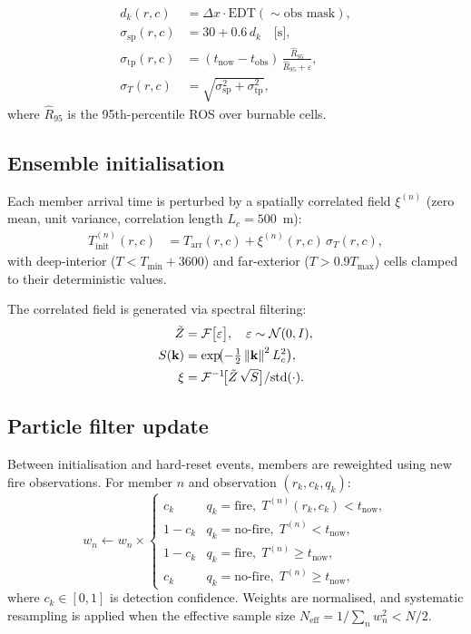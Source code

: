 \documentclass[11pt,twocolumn]{article}
\newcommand{\norm}[1]{\left\lVert#1\right\rVert}
\begin{document}
\begin{align}
  d_k(r,c) &= \Delta x\cdot\mathrm{EDT}(\sim\text{obs mask}),\label{eq:dist}\\
  \sigma_{\mathrm{sp}}(r,c) &= 30 + 0.6\,d_k\quad\text{[s]},\label{eq:sigsp}\\
  \sigma_{\mathrm{tp}}(r,c) &= (t_{\mathrm{now}}-t_{\mathrm{obs}})\,
    \frac{\hat{R}_{95}}{\hat{R}_{95}+\varepsilon},\label{eq:sigtp}\\
  \sigma_T(r,c) &= \sqrt{\sigma_{\mathrm{sp}}^2+\sigma_{\mathrm{tp}}^2},\label{eq:sigT}
\end{align}
where $\hat{R}_{95}$ is the 95th-percentile ROS over burnable cells.

\subsection{Ensemble initialisation}

Each member arrival time is perturbed by a spatially correlated field
$\xi^{(n)}$ (zero mean, unit variance, correlation length
$L_c=500$~m):
\begin{align}
  T^{(n)}_{\mathrm{init}}(r,c)
    &= T_{\mathrm{arr}}(r,c) + \xi^{(n)}(r,c)\,\sigma_T(r,c),\label{eq:Tinit}
\end{align}
with deep-interior ($T<T_{\min}+3600$) and far-exterior
($T>0.9T_{\mathrm{max}}$) cells clamped to their deterministic values.

The correlated field is generated via spectral filtering:
\begin{align}
  \tilde{Z} &= \mathcal{F}\bigl[\varepsilon\bigr],\quad\varepsilon\sim\mathcal{N}(0,I),\notag\\
  S(\mathbf{k}) &= \exp\!\bigl(-\tfrac{1}{2}\norm{\mathbf{k}}^2L_c^2\bigr),\notag\\
  \xi &= \mathcal{F}^{-1}\!\bigl[\tilde{Z}\,\sqrt{S}\bigr]/\mathrm{std}(\cdot).\label{eq:corrfield}
\end{align}

\subsection{Particle filter update}

Between initialisation and hard-reset events, members are reweighted
using new fire observations.  For member $n$ and observation $(r_k,c_k,q_k)$:
\begin{equation}
  w_n \leftarrow w_n\times
  \begin{cases}
    c_k & q_k=\text{fire},\;T^{(n)}(r_k,c_k)<t_{\mathrm{now}},\\
    1-c_k & q_k=\text{no-fire},\;T^{(n)}<t_{\mathrm{now}},\\
    1-c_k & q_k=\text{fire},\;T^{(n)}\ge t_{\mathrm{now}},\\
    c_k & q_k=\text{no-fire},\;T^{(n)}\ge t_{\mathrm{now}},
  \end{cases}\label{eq:pf}
\end{equation}
where $c_k\in[0,1]$ is detection confidence.  Weights are normalised,
and systematic resampling is applied when the effective sample size
$N_{\mathrm{eff}}=1/\!\sum_n w_n^2 < N/2$.
\end{document}
